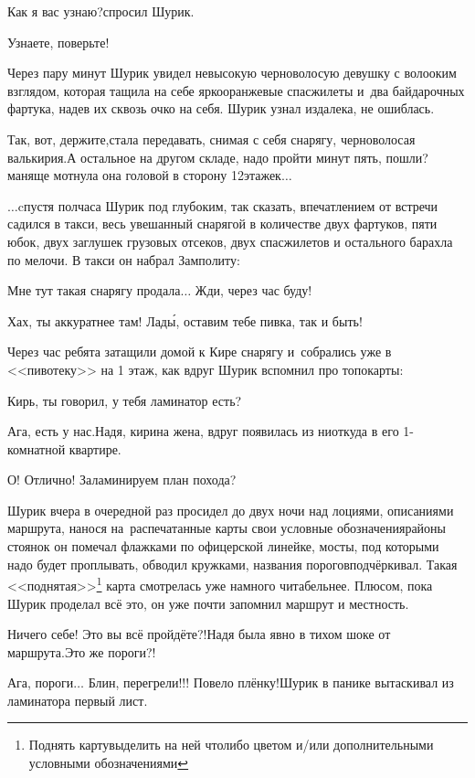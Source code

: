\diagdash Как я вас узнаю?\mdash спросил Шурик.

\diagdash Узнаете, поверьте!

Через пару минут Шурик увидел невысокую черноволосую девушку с волооким взглядом, которая тащила на себе ярко\sdash оранжевые спасжилеты и~два байдарочных фартука, надев их сквозь очко на себя. Шурик узнал издалека, не ошиблась.

\diagdash Так, вот, держите,\mdash стала передавать, снимая с себя снарягу, черноволосая валькирия.\mdash А остальное на другом складе, надо пройти минут пять, пошли?\mdash маняще мотнула она головой в сторону 12\sdash этажек$\ldots$

$\ldots$cпустя полчаса Шурик под глубоким, так сказать, впечатлением от встречи садился в такси, весь увешанный снарягой в количестве двух фартуков, пяти юбок, двух заглушек грузовых отсеков, двух спасжилетов и остального барахла по мелочи. В такси он набрал Замполиту:

\diagdash Мне тут такая снарягу продала$\ldots$ Жди, через час буду!

\diagdash Хах, ты аккуратнее там! Лад\'{ы}, оставим тебе пивка, так и быть!

Через час ребята затащили домой к Кире снарягу и~собрались уже в <<пивотеку>> на 1 этаж, как вдруг Шурик вспомнил про топокарты:

\diagdash Кирь, ты говорил, у тебя ламинатор есть?

\diagdash Ага, есть у нас.\mdash Надя, кирина жена, вдруг появилась из ниоткуда в его 1-комнатной квартире.

\diagdash О! Отлично! Заламинируем план похода?

\renewcommand*{\thefootnote}{\fnsymbol{footnote}}
Шурик вчера в очередной раз просидел до двух ночи над лоциями, описаниями маршрута, нанося на~распечатанные карты свои условные обозначения\mdash районы стоянок он помечал флажками по офицерской линейке, мосты, под которыми надо будет проплывать, обводил кружками, названия порогов\mdash подчёркивал. Такая <<поднятая>>\footnote[1]{Поднять карту\mdash выделить на ней что\sdash либо цветом и/или дополнительными условными обозначениями} карта смотрелась уже намного читабельнее. Плюсом, пока Шурик проделал всё это, он уже почти запомнил маршрут и местность.

\diagdash Ничего себе! Это вы всё пройдёте?!\mdash Надя была явно в тихом шоке от маршрута.\mdash Это же пороги?!

\diagdash Ага, пороги$\ldots$ Блин, перегрели!!! Повело плёнку!\mdash Шурик в панике вытаскивал из ламинатора первый лист.%


